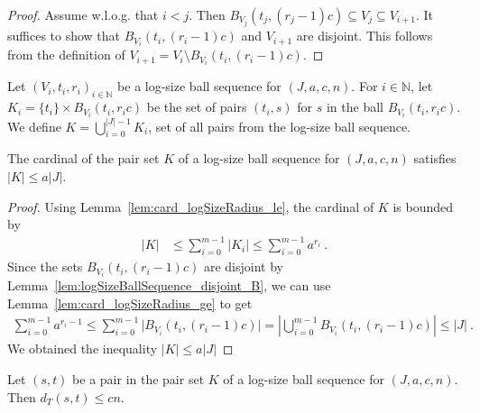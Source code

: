 \begin{proof}
  \leanok
Assume w.l.o.g. that $i < j$.
Then $B_{V_j}(t_j, (r_j-1)c) \subseteq V_j \subseteq V_{i+1}$.
It suffices to show that $B_{V_i}(t_i, (r_i-1)c)$ and $V_{i+1}$ are disjoint.
This follows from the definition of $V_{i+1} = V_i \setminus B_{V_i}(t_i, (r_i-1)c)$.
\end{proof}


\begin{definition}\label{def:pairSet}
  \leanok
Let $(V_i, t_i, r_i)_{i \in \mathbb{N}}$ be a log-size ball sequence for $(J, a, c, n)$.
For $i \in \mathbb{N}$, let $K_i = \{t_i\} \times B_{V_i}(t_i, r_i c)$ be the set of pairs $(t_i, s)$ for $s$ in the ball $B_{V_i}(t_i, r_i c)$.
We define $K = \bigcup_{i=0}^{\vert J \vert-1} K_i$, set of all pairs from the log-size ball sequence.
\end{definition}


\begin{lemma}\label{lem:card_pairSet_le}
  \leanok
The cardinal of the pair set $K$ of a log-size ball sequence for $(J, a, c, n)$ satisfies $|K| \le a |J|$.
\end{lemma}

\begin{proof}
  \leanok
Using Lemma~\ref{lem:card_logSizeRadius_le}, the cardinal of $K$ is bounded by
\begin{align*}
  \vert K \vert
  &\le \sum_{i=0}^{m-1} \vert K_i \vert
  \le \sum_{i=0}^{m-1} a^{r_i}
  \: .
\end{align*}
Since the sets $B_{V_i}(t_i, (r_i-1)c)$ are disjoint by Lemma~\ref{lem:logSizeBallSequence_disjoint_B}, we can use Lemma~\ref{lem:card_logSizeRadius_ge} to get
\begin{align*}
  \sum_{i=0}^{m-1} a^{r_i - 1}
  \le \sum_{i=0}^{m-1} \vert B_{V_i}(t_i, (r_i-1)c) \vert
  = \left\vert \bigcup_{i=0}^{m-1} B_{V_i}(t_i, (r_i-1)c) \right\vert
  \le \vert J \vert
  \: .
\end{align*}
We obtained the inequality $\vert K \vert \le a \vert J \vert$
\end{proof}


\begin{lemma}\label{lem:dist_le_of_mem_pairSet}
  \leanok
Let $(s, t)$ be a pair in the pair set $K$ of a log-size ball sequence for $(J, a, c, n)$.
Then $d_T(s, t) \le c n$.
\end{lemma}


